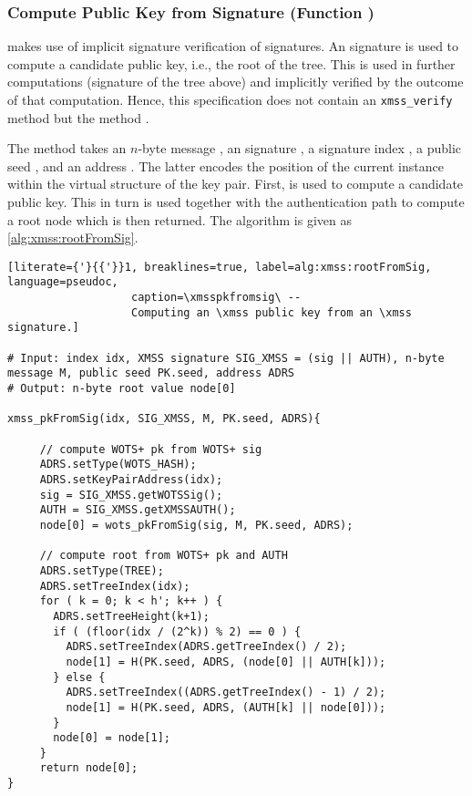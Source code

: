 \subsubsection{\xmss Compute Public Key from Signature (Function \xmsspkfromsig)}

   \spx makes use of implicit signature verification of \xmss signatures.
   An \xmss signature is used to compute a candidate \xmss public key, i.e., the
   root of the tree. This is used in further computations (signature of the tree above)
   and implicitly verified by the outcome of that computation. Hence, this
   specification does not contain an \texttt{xmss\_verify} method but the method
   \xmsspkfromsig.

   The method \xmsspkfromsig takes an $n$-byte message \msg,
   an \xmss signature \xmsssig, a signature index \idx, a public seed \pseed, and
   an address \adrs. The latter encodes the position of the current \xmss
   instance within the virtual structure of the \spx key pair. First,
   \wotspkfromsig is used to compute a candidate \wotsp public key. This in
   turn is used together with the authentication path to compute a root node
   which is then returned. The algorithm \xmsspkfromsig is given
   as \autoref{alg:xmss:rootFromSig}.



\begin{lstlisting}[literate={'}{{'}}1, breaklines=true, label=alg:xmss:rootFromSig, language=pseudoc,
                   caption=\xmsspkfromsig\ --
                   Computing an \xmss public key from an \xmss signature.]

# Input: index idx, XMSS signature SIG_XMSS = (sig || AUTH), n-byte message M, public seed PK.seed, address ADRS
# Output: n-byte root value node[0]

xmss_pkFromSig(idx, SIG_XMSS, M, PK.seed, ADRS){

     // compute WOTS+ pk from WOTS+ sig
     ADRS.setType(WOTS_HASH);
     ADRS.setKeyPairAddress(idx);
     sig = SIG_XMSS.getWOTSSig();
     AUTH = SIG_XMSS.getXMSSAUTH();
     node[0] = wots_pkFromSig(sig, M, PK.seed, ADRS);

     // compute root from WOTS+ pk and AUTH
     ADRS.setType(TREE);
     ADRS.setTreeIndex(idx);
     for ( k = 0; k < h'; k++ ) {
       ADRS.setTreeHeight(k+1);
       if ( (floor(idx / (2^k)) % 2) == 0 ) {
         ADRS.setTreeIndex(ADRS.getTreeIndex() / 2);
         node[1] = H(PK.seed, ADRS, (node[0] || AUTH[k]));
       } else {
         ADRS.setTreeIndex((ADRS.getTreeIndex() - 1) / 2);
         node[1] = H(PK.seed, ADRS, (AUTH[k] || node[0]));
       }
       node[0] = node[1];
     }
     return node[0];
}
\end{lstlisting}

